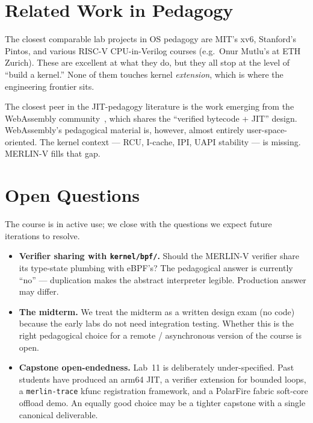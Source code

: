 \documentclass[11pt,a4paper]{article}
\begin{document}
\section{Related Work in Pedagogy}
\label{sec:related}

The closest comparable lab projects in OS pedagogy are MIT's
xv6, Stanford's Pintos, and various RISC-V CPU-in-Verilog
courses (e.g.\ Onur Mutlu's at ETH Zurich).  These are
excellent at what they do, but they all stop at the level of
``build a kernel.''  None of them touches kernel
\emph{extension}, which is where the engineering frontier sits.

The closest peer in the JIT-pedagogy literature is the work
emerging from the WebAssembly community~\cite{wasm-spec}, which
shares the ``verified bytecode + JIT'' design.  WebAssembly's
pedagogical material is, however, almost entirely
user-space-oriented.  The kernel context --- RCU, I-cache, IPI,
UAPI stability --- is missing.  MERLIN-V fills that gap.

\section{Open Questions}
\label{sec:open}

The course is in active use; we close with the questions we
expect future iterations to resolve.

\begin{itemize}[leftmargin=*]
  \item \textbf{Verifier sharing with \texttt{kernel/bpf/}.}
    Should the MERLIN-V verifier share its type-state plumbing
    with eBPF's?  The pedagogical answer is currently
    ``no'' --- duplication makes the abstract interpreter
    legible.  Production answer may differ.
  \item \textbf{The midterm.}  We treat the midterm as a
    written design exam (no code) because the early labs do
    not need integration testing.  Whether this is the right
    pedagogical choice for a remote / asynchronous version of
    the course is open.
  \item \textbf{Capstone open-endedness.}  Lab~11 is
    deliberately under-specified.  Past students have produced
    an arm64 JIT, a verifier extension for bounded loops, a
    \texttt{merlin-trace} kfunc registration framework, and a
    PolarFire fabric soft-core offload demo.  An equally good
    choice may be a tighter capstone with a single canonical
    deliverable.
\end{itemize}
\end{document}

